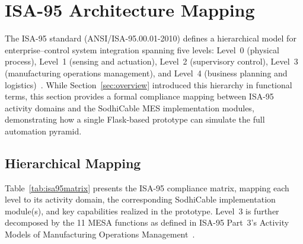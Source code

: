 \documentclass[11pt]{article}
\begin{document}
\section{ISA-95 Architecture Mapping}\label{sec:isa95mapping}

The ISA-95 standard (ANSI/ISA-95.00.01-2010) defines a hierarchical model for enterprise--control system integration spanning five levels: Level~0 (physical process), Level~1 (sensing and actuation), Level~2 (supervisory control), Level~3 (manufacturing operations management), and Level~4 (business planning and logistics)~\cite{isa95}.  While Section~\ref{sec:overview} introduced this hierarchy in functional terms, this section provides a formal compliance mapping between ISA-95 activity domains and the SodhiCable MES implementation modules, demonstrating how a single Flask-based prototype can simulate the full automation pyramid.

\subsection{Hierarchical Mapping}

Table~\ref{tab:isa95matrix} presents the ISA-95 compliance matrix, mapping each level to its activity domain, the corresponding SodhiCable implementation module(s), and key capabilities realized in the prototype.  Level~3 is further decomposed by the 11 MESA functions as defined in ISA-95 Part~3's Activity Models of Manufacturing Operations Management~\cite{isa95part3}.
\end{document}
